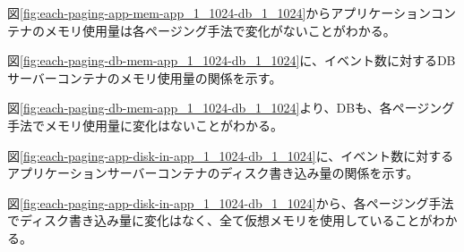 \documentclass[../../../../main]{subfiles}
\begin{document}
    

    図\ref{fig:each-paging-app-mem-app_1_1024-db_1_1024}からアプリケーションコンテナのメモリ使用量は各ページング手法で変化がないことがわかる。

    図\ref{fig:each-paging-db-mem-app_1_1024-db_1_1024}に、イベント数に対するDBサーバーコンテナのメモリ使用量の関係を示す。

    

    図\ref{fig:each-paging-db-mem-app_1_1024-db_1_1024}より、DBも、各ページング手法でメモリ使用量に変化はないことがわかる。

    \label{subsubsubsec:result-each-paging-only-limit-disk-in}

    図\ref{fig:each-paging-app-disk-in-app_1_1024-db_1_1024}に、イベント数に対するアプリケーションサーバーコンテナのディスク書き込み量の関係を示す。

    

    図\ref{fig:each-paging-app-disk-in-app_1_1024-db_1_1024}から、各ページング手法でディスク書き込み量に変化はなく、全て仮想メモリを使用していることがわかる。
\end{document}
